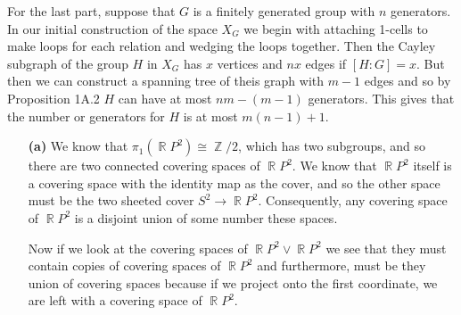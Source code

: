 \documentclass{article}
\DeclareMathOperator{\Z}{\mathbb{Z}}
\DeclareMathOperator{\R}{\mathbb{R}}
\newcommand{\exercise}[1]{\noindent{\textbf{Exercise #1:}}}
\begin{document}
For the last part, suppose that $G$ is a finitely generated group with
$n$ generators. In our initial construction of the space $X_G$ we
begin with attaching 1-cells to make loops for each relation and
wedging the loops together. Then the Cayley subgraph of the group $H$
in $X_G$ has $x$ vertices and $nx$ edges if $[H : G] = x$. But then we
can construct a spanning tree of theis graph with $m-1$ edges and so
by Proposition 1A.2 $H$ can have at most $nm - (m-1)$ generators. This
gives that the number or generators for $H$ is at most $m(n-1) + 1$.

\exercise{A4}
\begin{enumerate}
\item[\textbf{(a)}] We know that $\pi_1(\R P^2) \cong \Z/2$, which has
  two subgroups, and so there are two connected covering spaces of $\R
  P^2$. We know that $\R P^2$ itself is a covering space with the
  identity map as the cover, and so the other space must be the two
  sheeted cover $S^2 \to \R P^2$. Consequently, any covering space of
  $\R P^2$ is a disjoint union of some number these spaces.

  Now if we look at the covering spaces of $\R P^2 \vee \R P^2$ we see
  that they must contain copies of covering spaces of $\R P^2$ and
  furthermore, must be they union of covering spaces because if we
  project onto the first coordinate, we are left with a covering space
  of $\R P^2$.


\end{enumerate}
\end{document}

